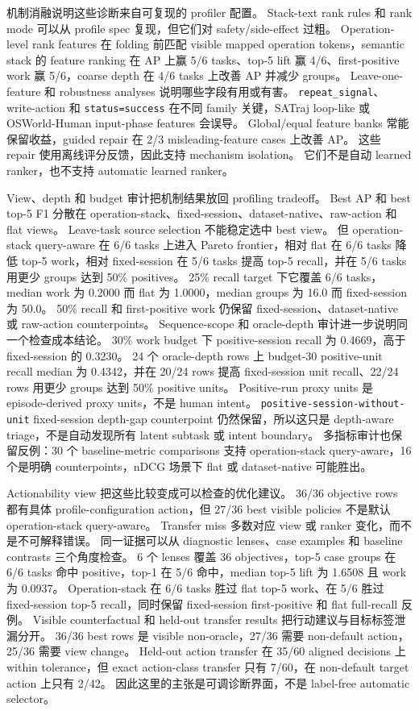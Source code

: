\documentclass[10pt,twocolumn]{ctexart}
\begin{document}
机制消融说明这些诊断来自可复现的 profiler 配置。
Stack-text rank rules 和 rank mode 可以从 profile spec 复现，但它们对 safety/side-effect 过粗。
Operation-level rank features 在 folding 前匹配 visible mapped operation tokens，semantic stack 的 feature ranking 在 AP 上赢 5/6 tasks、top-5 lift 赢 4/6、first-positive work 赢 5/6，coarse depth 在 4/6 tasks 上改善 AP 并减少 groups。
Leave-one-feature 和 robustness analyses 说明哪些字段有用或有害。
\texttt{repeat\_signal}、write-action 和 \texttt{status=success} 在不同 family 关键，SATraj loop-like 或 OSWorld-Human input-phase features 会误导。
Global/equal feature banks 常能保留收益，guided repair 在 2/3 misleading-feature cases 上改善 AP。
这些 repair 使用离线评分反馈，因此支持 mechanism isolation。
它们不是自动 learned ranker，也不支持 automatic learned ranker。

View、depth 和 budget 审计把机制结果放回 profiling tradeoff。
Best AP 和 best top-5 F1 分散在 operation-stack、fixed-session、dataset-native、raw-action 和 flat views。
Leave-task source selection 不能稳定选中 best view。
但 operation-stack query-aware 在 6/6 tasks 上进入 Pareto frontier，相对 flat 在 6/6 tasks 降低 top-5 work，相对 fixed-session 在 5/6 tasks 提高 top-5 recall，并在 5/6 tasks 用更少 groups 达到 50\% positives。
25\% recall target 下它覆盖 6/6 tasks，median work 为 0.2000 而 flat 为 1.0000，median groups 为 16.0 而 fixed-session 为 50.0。
50\% recall 和 first-positive work 仍保留 fixed-session、dataset-native 或 raw-action counterpoints。
Sequence-scope 和 oracle-depth 审计进一步说明同一个检查成本结论。
30\% work budget 下 positive-session recall 为 0.4669，高于 fixed-session 的 0.3230。
24 个 oracle-depth rows 上 budget-30 positive-unit recall median 为 0.4342，并在 20/24 rows 提高 fixed-session unit recall、22/24 rows 用更少 groups 达到 50\% positive units。
Positive-run proxy units 是 episode-derived proxy units，不是 human intent。
\texttt{positive-session-without-unit} fixed-session depth-gap counterpoint 仍然保留，所以这只是 depth-aware triage，不是自动发现所有 latent subtask 或 intent boundary。
多指标审计也保留反例：30 个 baseline-metric comparisons 支持 operation-stack query-aware，16 个是明确 counterpoints，nDCG 场景下 flat 或 dataset-native 可能胜出。

Actionability view 把这些比较变成可以检查的优化建议。
36/36 objective rows 都有具体 profile-configuration action，但 27/36 best visible policies 不是默认 operation-stack query-aware。
Transfer miss 多数对应 view 或 ranker 变化，而不是不可解释错误。
同一证据可以从 diagnostic lenses、case examples 和 baseline contrasts 三个角度检查。
6 个 lenses 覆盖 36 objectives，top-5 case groups 在 6/6 tasks 命中 positive，top-1 在 5/6 命中，median top-5 lift 为 1.6508 且 work 为 0.0937。
Operation-stack 在 6/6 tasks 胜过 flat top-5 work、在 5/6 胜过 fixed-session top-5 recall，同时保留 fixed-session first-positive 和 flat full-recall 反例。
Visible counterfactual 和 held-out transfer results 把行动建议与目标标签泄漏分开。
36/36 best rows 是 visible non-oracle，27/36 需要 non-default action，25/36 需要 view change。
Held-out action transfer 在 35/60 aligned decisions 上 within tolerance，但 exact action-class transfer 只有 7/60，在 non-default target action 上只有 2/42。
因此这里的主张是可调诊断界面，不是 label-free automatic selector。
\end{document}
